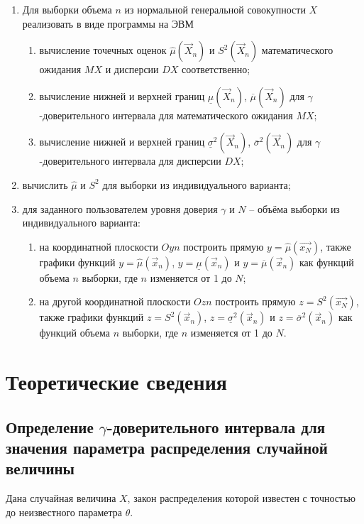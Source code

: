 \documentclass[12pt]{report}
\begin{document}
\begin{enumerate}
	\item Для выборки объема $n$ из нормальной генеральной совокупности $X$ реализовать в виде программы на ЭВМ
	\begin{enumerate}
		\item вычисление точечных оценок $\hat\mu(\vec X_n)$ и $S^2(\vec X_n)$ математического ожидания $MX$ и дисперсии $DX$ соответственно;
		\item вычисление нижней и верхней границ $\underline\mu(\vec X_n)$, $\overline\mu(\vec X_n)$ для $\gamma$-доверительного интервала для математического ожидания $MX$;
		\item вычисление нижней и верхней границ $\underline\sigma^2(\vec X_n)$, $\overline\sigma^2(\vec X_n)$ для $\gamma$-доверительного интервала для дисперсии $DX$;
	\end{enumerate}
	\item вычислить $\hat\mu$ и $S^2$ для выборки из индивидуального варианта;
	\item для заданного пользователем уровня доверия $\gamma$ и $N$ – объёма выборки из индивидуального варианта:
	\begin{enumerate}
		\item на координатной плоскости $Oyn$ построить прямую $y = \hat\mu(\vec{x_N})$, также графики функций $y = \hat\mu(\vec x_n)$, $y = \underline\mu(\vec x_n)$ и $y = \overline\mu(\vec x_n)$ как функций объема $n$ выборки, где $n$ изменяется от 1 до $N$;
		\item на другой координатной плоскости $Ozn$ построить прямую $z = S^2(\vec{x_N})$, также графики функций $z = S^2(\vec x_n)$, $z = \underline\sigma^2(\vec x_n)$ и $z = \overline\sigma^2(\vec x_n)$ как функций объема $n$ выборки, где $n$ изменяется от 1 до $N$.
	\end{enumerate}
\end{enumerate}

\chapter*{Теоретические сведения}

\section*{Определение $\gamma$-доверительного интервала для значения параметра распределения случайной величины}

Дана случайная величина $X$, закон распределения которой известен с точностью до неизвестного параметра $\theta$.
\end{document}
